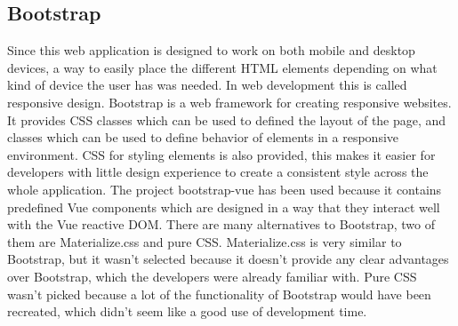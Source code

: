 \subsection{Bootstrap}
Since this web application is designed to work on both mobile and desktop devices, a way to easily place the different HTML elements depending on what kind of device the user has was needed. In web development this is called responsive design. Bootstrap is a web framework for creating responsive websites. It provides CSS classes which can be used to defined the layout of the page, and classes which can be used to define behavior of elements in a responsive environment. CSS for styling elements is also provided, this makes it easier for developers with little design experience to create a consistent style across the whole application. The project bootstrap-vue has been used because it contains predefined Vue components which are designed in a way that they interact well with the Vue reactive DOM. There are many alternatives to Bootstrap, two of them are Materialize.css and pure CSS. Materialize.css is very similar to Bootstrap, but it wasn't selected because it doesn't provide any clear advantages over Bootstrap, which the developers were already familiar with. Pure CSS wasn't picked because a lot of the functionality of Bootstrap would have been recreated, which didn't seem like a good use of development time.